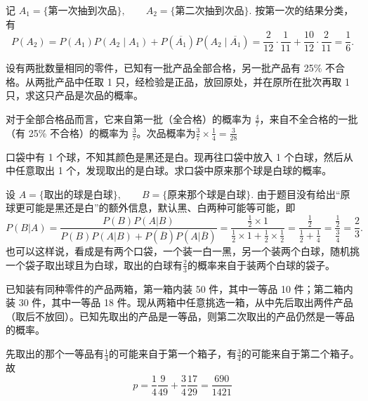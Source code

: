 \documentclass[lang=cn,11pt]{elegantbook}
\begin{document}
\begin{solution}
记
\(
A_1=\{\text{第一次抽到次品}\},\qquad A_2=\{\text{第二次抽到次品}\}.
\)
按第一次的结果分类，有
\[
P(A_2)=P(A_1)P(A_2\mid A_1)+P(\overline{A_1})P(A_2\mid \overline{A_1})
=\frac{2}{12}\cdot\frac{1}{11}+\frac{10}{12}\cdot\frac{2}{11}
=\frac16.
\]
\end{solution}

\begin{exercise}\label{exer:1-16}
设有两批数量相同的零件，已知有一批产品全部合格，另一批产品有 25\% 不合格。从两批产品中任取 1 只，经检验是正品，放回原处，并在原所在批次再取 1 只，求这只产品是次品的概率。
\end{exercise}

\begin{solution}
对于全部合格品而言，它来自第一批（全合格）的概率为 \(\frac{4}{7}\)，来自不全合格的一批（有 25\% 不合格）的概率为 \(\frac{3}{7}\)。次品概率为$\frac{3}{7}\times\frac{1}{4}=\frac{3}{28}$
\end{solution}


\begin{exercise}\label{exer:1-40}
口袋中有 1 个球，不知其颜色是黑还是白。现再往口袋中放入 1 个白球，然后从中任意取出 1 个，发现取出的是白球。求口袋中原来那个球是白球的概率。
\end{exercise}

\begin{solution}
设
\(
A=\{\text{取出的球是白球}\},\qquad B=\{\text{原来那个球是白球}\}.
\)
由于题目没有给出“原球更可能是黑还是白”的额外信息，默认黑、白两种可能等可能，即
\[
P(B|A)=\frac{P(B)P(A|B)}{P(B)P(A|B)+P(\overline B)P(A|\overline B)}
=\frac{\frac12\times 1}{\frac12\times 1+\frac12\times\frac12}
=\frac{\frac12}{\frac12+\frac14}
=\frac{\frac12}{\frac34}
=\frac23.
\]
也可以这样说，看成是有两个口袋，一个装一白一黑，另一个装两个白球，随机挑一个袋子取出球且为白球，取出的白球有$\frac23$的概率来自于装两个白球的袋子。
\end{solution}

\begin{exercise}\label{exer:1-41}
已知装有同种零件的产品两箱，第一箱内装 50 件，其中一等品 10 件；第二箱内装 30 件，其中一等品 18 件。现从两箱中任意挑选一箱，从中先后取出两件产品（取后不放回）。已知先取出的产品是一等品，则第二次取出的产品仍然是一等品的概率。
\end{exercise}

\begin{solution}
先取出的那个一等品有$\frac14$的可能来自于第一个箱子，有$\frac34$的可能来自于第二个箱子。故
\[p = \frac{1}{4}\frac{9}{49}+\frac{3}{4}\frac{17}{29}= \dfrac{690}{1421}\]
\end{solution}
\end{document}
